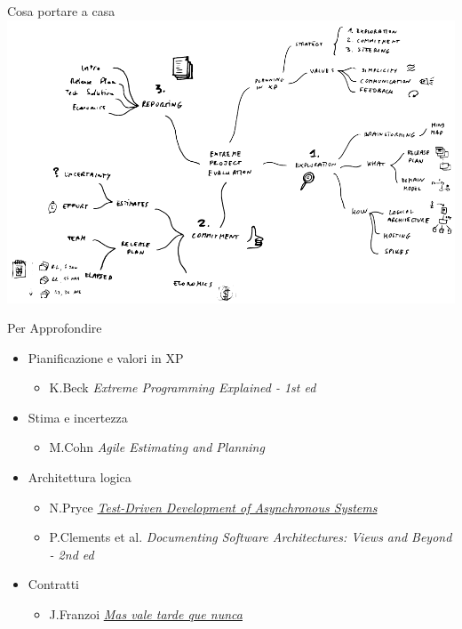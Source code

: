 \documentclass[compress, red, 14pt, pdf]{beamer}
\newcommand{\highlight}[1]{{\color{purple} \emph{#1}}}
\begin{document}
	\begin{frame}{Cosa portare a casa}
		\hspace*{-0.5cm} \includegraphics[scale=0.26]{images/takeaway}
	\end{frame}
	
	\begin{frame}{Per Approfondire}
		\begin{itemize}	
			\item Pianificazione e valori in XP
				\begin{itemize}
					\item {\small K.Beck \highlight{Extreme Programming Explained - 1st ed}}
				\end{itemize}

			\item Stima e incertezza
				\begin{itemize}
					\item {\small M.Cohn \highlight{Agile Estimating and Planning}}
				\end{itemize}

			\item Architettura logica
				\begin{itemize}
					\item {\small N.Pryce \highlight{\href{http://www.natpryce.com/articles/000755.html}{Test-Driven Development of Asynchronous Systems}}}
					\item {\small P.Clements et al. \highlight{Documenting Software Architectures: Views and Beyond - 2nd ed}}
				\end{itemize}

			\item Contratti
				\begin{itemize}
					\item {\small J.Franzoi \highlight{\href{http://jfranzoi.wordpress.com/2011/11/23/mas-vale-tarde-que-nunca/}{Mas vale tarde que nunca}}}
				\end{itemize}
		\end{itemize}
		
		
	\end{frame}
\end{document}
